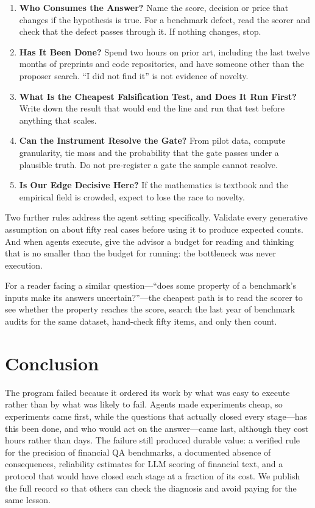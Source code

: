 \documentclass[11pt]{article}
\begin{document}
\begin{enumerate}[leftmargin=1.3em]
\item \textbf{Who Consumes the Answer?} Name the score, decision or price that changes if the hypothesis is true. For a benchmark defect, read the scorer and check that the defect passes through it. If nothing changes, stop.
\item \textbf{Has It Been Done?} Spend two hours on prior art, including the last twelve months of preprints and code repositories, and have someone other than the proposer search. ``I did not find it'' is not evidence of novelty.
\item \textbf{What Is the Cheapest Falsification Test, and Does It Run First?} Write down the result that would end the line and run that test before anything that scales.
\item \textbf{Can the Instrument Resolve the Gate?} From pilot data, compute granularity, tie mass and the probability that the gate passes under a plausible truth. Do not pre-register a gate the sample cannot resolve.
\item \textbf{Is Our Edge Decisive Here?} If the mathematics is textbook and the empirical field is crowded, expect to lose the race to novelty.
\end{enumerate}

Two further rules address the agent setting specifically. Validate every generative assumption on about fifty real cases before using it to produce expected counts. And when agents execute, give the advisor a budget for reading and thinking that is no smaller than the budget for running: the bottleneck was never execution.

For a reader facing a similar question---``does some property of a benchmark's inputs make its answers uncertain?''---the cheapest path is to read the scorer to see whether the property reaches the score, search the last year of benchmark audits for the same dataset, hand-check fifty items, and only then count.

\section{Conclusion}

The program failed because it ordered its work by what was easy to execute rather than by what was likely to fail. Agents made experiments cheap, so experiments came first, while the questions that actually closed every stage---has this been done, and who would act on the answer---came last, although they cost hours rather than days. The failure still produced durable value: a verified rule for the precision of financial QA benchmarks, a documented absence of consequences, reliability estimates for LLM scoring of financial text, and a protocol that would have closed each stage at a fraction of its cost. We publish the full record so that others can check the diagnosis and avoid paying for the same lesson.
\end{document}
